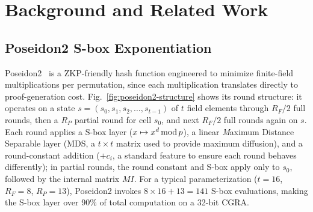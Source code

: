 \section{Background and Related Work}
\label{sec:background}
\subsection{Poseidon2 S-box Exponentiation}
\label{subsec:poseidon2}

Poseidon2~\cite{poseidon2} is a ZKP-friendly hash function engineered to minimize finite-field multiplications per permutation, since each multiplication translates directly to proof-generation cost. Fig.~\ref{fig:poseidon2-structure} shows its round structure: it operates on a state $s = (s_0, s_1, s_2, \ldots, s_{t-1})$ of $t$ field elements through $R_F/2$ full rounds, then a $R_P$ partial round for cell $s_0$, and next $R_F/2$ full rounds again on $s$. Each round applies a S-box layer ($x \mapsto x^d \operatorname{mod} p$), a linear {\textit Maximum Distance Separable} layer (MDS, a $t \times t$ matrix used to provide maximum diffusion), and a round-constant addition ($+c_i$, a standard feature to ensure each round behaves differently); in partial rounds, the round constant and S-box apply only to $s_0$, followed by the internal matrix $MI$.
For a typical parameterization ($t\!=\!16$, $R_F\!=\!8$, $R_P\!=\!13$), Poseidon2 invokes $8 \times 16 + 13 = 141$ S-box evaluations, making the S-box layer over 90\% of total computation on a 32-bit CGRA.

